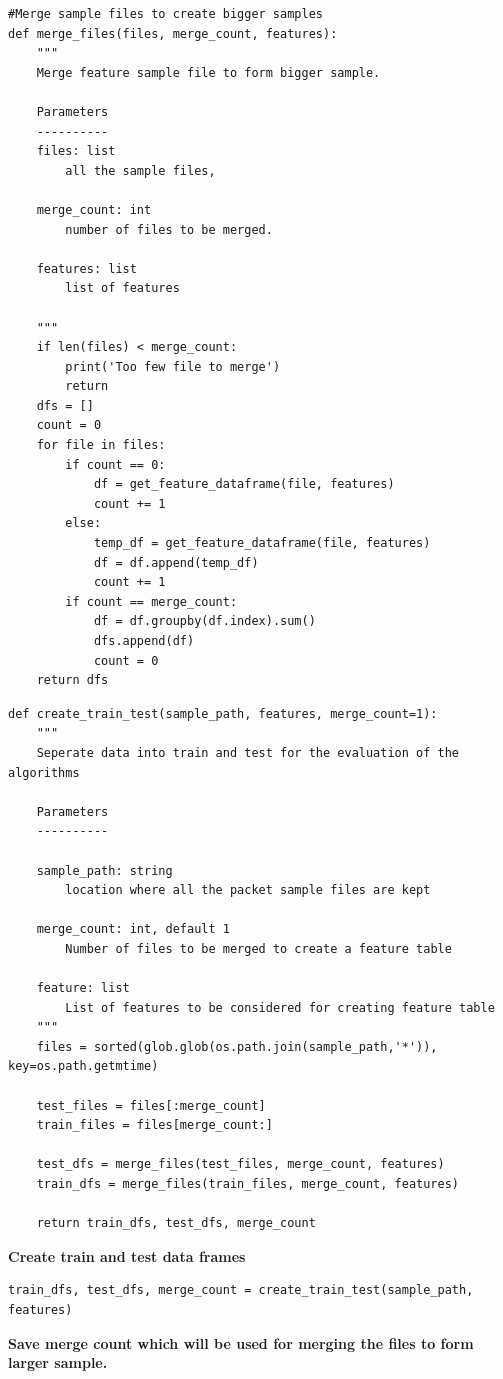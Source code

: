 \documentclass{article}
\begin{document}
\begin{verbatim}
#Merge sample files to create bigger samples
def merge_files(files, merge_count, features):
    """
    Merge feature sample file to form bigger sample.

    Parameters
    ----------
    files: list
        all the sample files,

    merge_count: int
        number of files to be merged.

    features: list
        list of features

    """
    if len(files) < merge_count:
        print('Too few file to merge')
        return
    dfs = []
    count = 0
    for file in files:
        if count == 0:
            df = get_feature_dataframe(file, features)
            count += 1
        else:
            temp_df = get_feature_dataframe(file, features)
            df = df.append(temp_df)
            count += 1
        if count == merge_count:
            df = df.groupby(df.index).sum()
            dfs.append(df)
            count = 0
    return dfs
\end{verbatim}
\begin{verbatim}
def create_train_test(sample_path, features, merge_count=1):
    """
    Seperate data into train and test for the evaluation of the algorithms

    Parameters
    ----------

    sample_path: string
        location where all the packet sample files are kept

    merge_count: int, default 1
        Number of files to be merged to create a feature table

    feature: list
        List of features to be considered for creating feature table
    """
    files = sorted(glob.glob(os.path.join(sample_path,'*')),  key=os.path.getmtime)

    test_files = files[:merge_count]
    train_files = files[merge_count:]

    test_dfs = merge_files(test_files, merge_count, features)
    train_dfs = merge_files(train_files, merge_count, features)

    return train_dfs, test_dfs, merge_count
\end{verbatim}
\textbf{Create train and test data frames}
\begin{verbatim}
train_dfs, test_dfs, merge_count = create_train_test(sample_path, features)
\end{verbatim}
\textbf{Save merge count which will be used for merging the files to form larger sample.}
\end{document}
